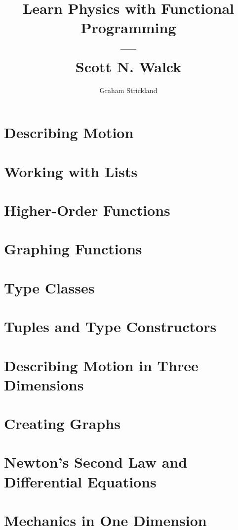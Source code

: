 \documentclass{article}
\title{Learn Physics with Functional Programming\\---\\Scott N. Walck}
\author{Graham Strickland}
\numberwithin{figure}{section}
\numberwithin{table}{section}
\numberwithin{equation}{section}
\begin{document}
\maketitle  

\setcounter{section}{3}
\section{Describing Motion}


\section{Working with Lists}


\section{Higher-Order Functions}


\section{Graphing Functions}


\section{Type Classes}


\section{Tuples and Type Constructors}


\section{Describing Motion in Three Dimensions}


\section{Creating Graphs}


\setcounter{section}{13}
\section{Newton's Second Law and Differential Equations}


\section{Mechanics in One Dimension}

\end{document}
